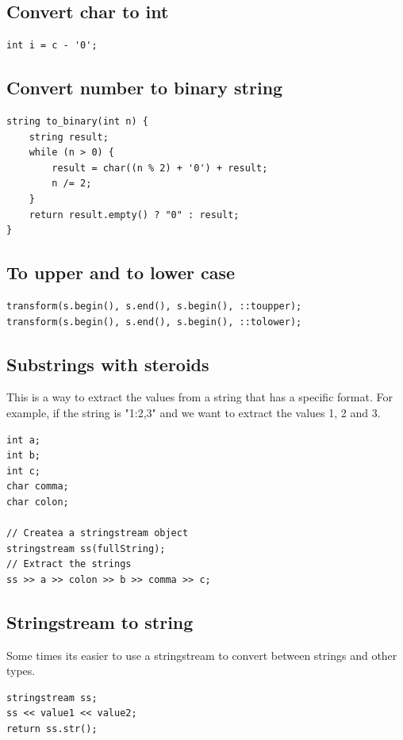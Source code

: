 \documentclass[10pt]{article}
\begin{document}
\begin{multicols*}{2}
\subsection{Convert char to int}
\begin{lstlisting}[style=compactcpp]
int i = c - '0';
\end{lstlisting}

\subsection{Convert number to binary string}
\begin{lstlisting}[style=compactcpp]
string to_binary(int n) {
    string result;
    while (n > 0) {
        result = char((n % 2) + '0') + result;
        n /= 2;
    }
    return result.empty() ? "0" : result;
}
\end{lstlisting}

\subsection{To upper and to lower case}
\begin{lstlisting}[style=compactcpp]
transform(s.begin(), s.end(), s.begin(), ::toupper);
transform(s.begin(), s.end(), s.begin(), ::tolower);
\end{lstlisting}

\subsection{Substrings with steroids}
This is a way to extract the values from a string that has a specific format. For example, if the string is "1:2,3" and we want to extract the values 1, 2 and 3.
\begin{lstlisting}[style=compactcpp]
int a;
int b;
int c;
char comma;
char colon;

// Createa a stringstream object
stringstream ss(fullString);
// Extract the strings
ss >> a >> colon >> b >> comma >> c;
\end{lstlisting}

\subsection{Stringstream to string}
Some times its easier to use a stringstream to convert between strings and other types.
\begin{lstlisting}[style=compactcpp]
stringstream ss;
ss << value1 << value2;
return ss.str();
\end{lstlisting}


\end{multicols*}
\end{document}
